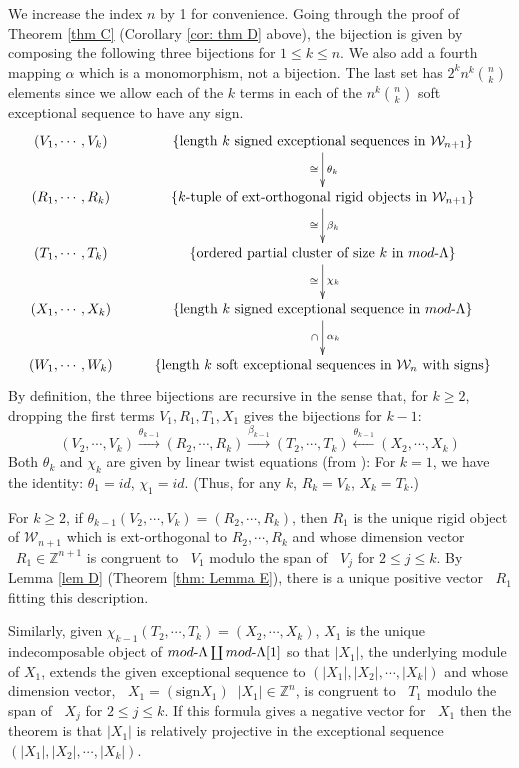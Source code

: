 \documentclass[11pt]{amsart}
\theoremstyle{definition}
\theoremstyle{remark}
\numberwithin{equation}{section}
\DeclareMathOperator{\undim}{\underline{dim}}
\newcommand{\field}[1]{\mathbb{#1}}
\newcommand{\ZZ}{\ensuremath{{\field{Z}}}}
\newcommand{\cW}{\ensuremath{{\mathcal{W}}}}
\begin{document}
We increase the index $n$ by 1 for convenience.
Going through the proof of Theorem \ref{thm C} (Corollary \ref{cor: thm D} above), the bijection is given by composing the following three bijections for $1\le k\le n$. We also add a fourth mapping $\alpha$ which is a monomorphism, not a bijection. The last set has $2^kn^k\binom nk$ elements since we allow each of the $k$ terms in each of the $n^k\binom nk$ soft exceptional sequence to have any sign.
\[
\xymatrix{%
(V_1,\cdots,V_k)  & \{\text{length $k$ signed exceptional sequences in $\cW_{n+1}$}\} \ar[d]^{\theta_k}_\cong\\
(R_1,\cdots,R_k)  & \{\text{$k$-tuple of ext-orthogonal rigid objects in $\cW_{n+1}$}\} \ar[d]^{\beta_k}_\cong\\
(T_1,\cdots,T_k) & \{\text{ordered partial cluster of size $k$ in $mod\text-\Lambda$}\}\ar[d]^{\chi_k}_\cong\\
(X_1,\cdots,X_k)  & \{\text{length $k$ signed exceptional sequence in $mod\text-\Lambda$}\}\ar[d]^{\alpha_k}_\cap\\
(W_1,\cdots,W_k)  & \{\text{length $k$ soft exceptional sequences in $\cW_{n}$ with signs}\} 
	}%
\]
By definition, the three bijections are recursive in the sense that, for $k\ge2$, dropping the first terms $V_1,R_1,T_1,X_1$ gives the bijections for $k-1$:
\[
	(V_2,\cdots,V_k)\xrightarrow{\theta_{k-1}} (R_2,\cdots,R_k)\xrightarrow{\beta_{k-1}} (T_2,\cdots,T_k)\xleftarrow{\theta_{k-1}}(X_2,\cdots,X_k) 
\]
Both $\theta_k$ and $\chi_k$ are given by linear twist equations (from \cite{IT13}): For $k=1$, we have the identity: $\theta_1=id$, $\chi_1=id$. (Thus, for any $k$, $R_k=V_k$, $X_k=T_k$.) 

For $k\ge2$, if $\theta_{k-1}(V_2,\cdots,V_k)=(R_2,\cdots,R_k)$, then $R_1$ is the unique rigid object of $\cW_{n+1}$ which is ext-orthogonal to $R_2,\cdots,R_k$ and whose dimension vector $\undim R_1\in \ZZ^{n+1}$ is congruent to $\undim V_1$ modulo the span of $\undim V_j$ for $2\le j\le k$. By Lemma \ref{lem D} (Theorem \ref{thm: Lemma E}), there is a unique positive vector $\undim R_1$ fitting this description.

Similarly, given $\chi_{k-1}(T_2,\cdots,T_k)=(X_2,\cdots,X_k)$, $X_1$ is the unique indecomposable object of $mod\text-\Lambda\coprod mod\text-\Lambda[1]$ so that $|X_1|$, the underlying module of $X_1$, extends the given exceptional sequence to $(|X_1|,|X_2|,\cdots,|X_k|)$ and whose dimension vector, $\undim X_1=(\text{sign} X_1)\undim |X_1|\in\ZZ^n$, is congruent to $\undim T_1$ modulo the span of $\undim X_j$ for $2\le j\le k$. If this formula gives a negative vector for $\undim X_1$ then the theorem is that $|X_1|$ is relatively projective in the exceptional sequence $(|X_1|,|X_2|,\cdots,|X_k|)$.
\end{document}
